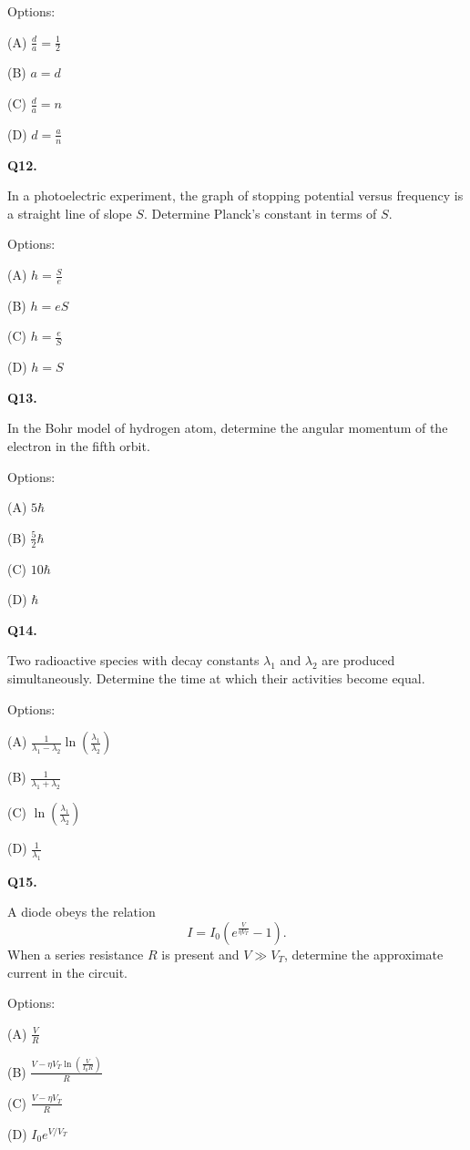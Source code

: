 \documentclass[12pt]{article}
\begin{document}
Options:

(A) $\frac{d}{a} = \frac{1}{2}$

(B) $a = d$

(C) $\frac{d}{a} = n$

(D) $d = \frac{a}{n}$

\vspace{0.7cm}

\textbf{Q12.}

In a photoelectric experiment, the graph of stopping potential versus frequency 
is a straight line of slope $S$. 
Determine Planck's constant in terms of $S$.

Options:

(A) $h = \frac{S}{e}$

(B) $h = eS$

(C) $h = \frac{e}{S}$

(D) $h = S$

\vspace{0.7cm}

\textbf{Q13.}

In the Bohr model of hydrogen atom, determine the angular momentum 
of the electron in the fifth orbit.

Options:

(A) $5\hbar$

(B) $\frac{5}{2}\hbar$

(C) $10\hbar$

(D) $\hbar$

\vspace{0.7cm}

\textbf{Q14.}

Two radioactive species with decay constants $\lambda_1$ and $\lambda_2$ 
are produced simultaneously. 
Determine the time at which their activities become equal.

Options:

(A) $\frac{1}{\lambda_1-\lambda_2}\ln\left(\frac{\lambda_1}{\lambda_2}\right)$

(B) $\frac{1}{\lambda_1+\lambda_2}$

(C) $\ln\left(\frac{\lambda_1}{\lambda_2}\right)$

(D) $\frac{1}{\lambda_1}$

\vspace{0.7cm}

\textbf{Q15.}

A diode obeys the relation 
\[
I = I_0\left(e^{\frac{V}{\eta V_T}} -1\right).
\]
When a series resistance $R$ is present and $V \gg V_T$, 
determine the approximate current in the circuit.

Options:

(A) $\frac{V}{R}$

(B) $\frac{V-\eta V_T \ln\left(\frac{V}{I_0R}\right)}{R}$

(C) $\frac{V-\eta V_T}{R}$

(D) $I_0 e^{V/V_T}$

\end{document}
